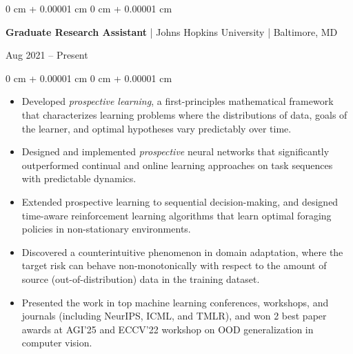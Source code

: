 \documentclass[10pt, letterpaper]{article}
\newenvironment{highlights}{
    \begin{itemize}[
        topsep=0.10 cm,
        parsep=0.10 cm,
        partopsep=0pt,
        itemsep=0pt,
        leftmargin=0 cm + 10pt
    ]
}{
    \end{itemize}
} %
\newenvironment{onecolentry}{
    \begin{adjustwidth}{
        0 cm + 0.00001 cm
    }{
        0 cm + 0.00001 cm
    }
}{
    \end{adjustwidth}
} %
\newenvironment{twocolentry}[2][]{
    \onecolentry
    \def\secondColumn{#2}
    \setcolumnwidth{\fill, 4.5 cm}
    \begin{paracol}{2}
}{
    \switchcolumn \raggedleft \secondColumn
    \end{paracol}
    \endonecolentry
} %
\begin{document}
        \begin{twocolentry}{Aug 2021 – Present}
        \textbf{Graduate Research Assistant} | Johns Hopkins University | Baltimore, MD
        \end{twocolentry}
        \vspace{0.10 cm}
        \begin{onecolentry}
            \begin{highlights}
                \item Developed \textit{prospective learning}, a first-principles mathematical framework that characterizes learning problems where the distributions of data, goals of the learner, and optimal hypotheses vary predictably over time.
                \item Designed and implemented \textit{prospective} neural networks that significantly outperformed continual and online learning approaches on task sequences with predictable dynamics.
                \item Extended prospective learning to sequential decision-making, and designed time-aware reinforcement learning algorithms that learn optimal foraging policies in non-stationary environments.
                \item Discovered a counterintuitive phenomenon in domain adaptation, where the target risk can behave non-monotonically with respect to the amount of source (out-of-distribution) data in the training dataset.
                \item Presented the work in top machine learning conferences, workshops, and journals (including NeurIPS, ICML, and TMLR), and won 2 best paper awards at AGI'25 and ECCV'22 workshop on OOD generalization in computer vision.
            \end{highlights}
        \end{onecolentry}

        \vspace{0.2 cm}
\end{document}
